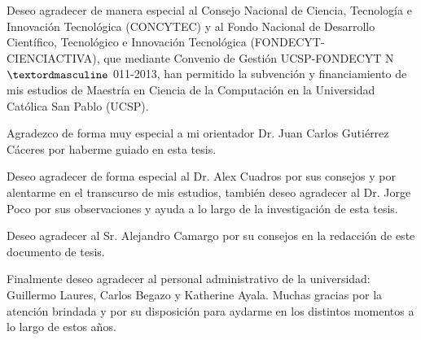 \begin{agradecimientos}


Deseo agradecer de manera especial al Consejo Nacional de Ciencia, Tecnología e Innovación Tecnológica (CONCYTEC) y al Fondo Nacional de Desarrollo Científico, Tecnológico e Innovación Tecnológica (FONDECYT-CIENCIACTIVA), que mediante Convenio de Gestión UCSP-FONDECYT N$\textordmasculine$ 011-2013, %
han permitido la subvención y financiamiento de mis estudios de Maestría en Ciencia de la Computación en la Universidad Católica San Pablo (UCSP).

Agradezco de forma muy especial a mi orientador Dr. Juan Carlos Gutiérrez Cáceres por haberme guiado en esta tesis. 

Deseo agradecer de forma especial al Dr. Alex Cuadros por sus consejos y por alentarme en el transcurso de mis estudios, también deseo agradecer al Dr. Jorge Poco por sus observaciones y ayuda a lo largo de la investigación de esta tesis.

Deseo agradecer al Sr. Alejandro Camargo por su consejos en la redacción de este documento de tesis.

Finalmente deseo agradecer al personal administrativo de la universidad: Guillermo Laures, Carlos Begazo y Katherine Ayala. Muchas gracias por la atención brindada y por su disposición para aydarme en los distintos momentos a lo largo de estos años.
\end{agradecimientos}